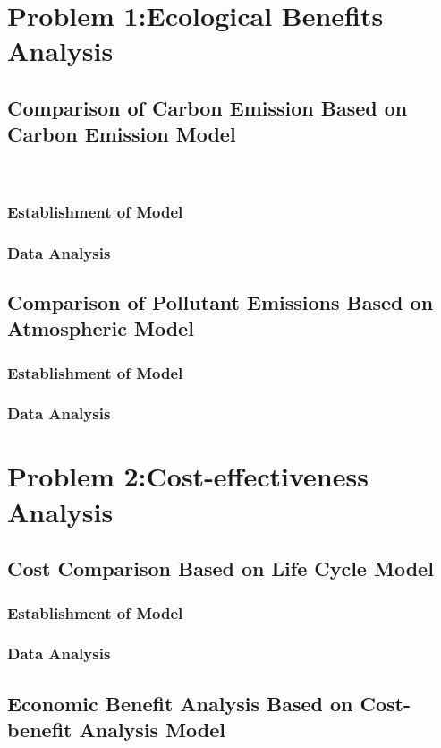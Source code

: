 \documentclass[12pt]{article}
\begin{document}
\section{Problem 1:Ecological Benefits Analysis}
\subsection{Comparison of Carbon Emission Based on Carbon Emission Model}\
\subsubsection{Establishment of Model}
\subsubsection{Data Analysis}

\subsection{Comparison of Pollutant Emissions Based on Atmospheric Model}
\subsubsection{Establishment of Model}
\subsubsection{Data Analysis}

\section{Problem 2:Cost-effectiveness Analysis}
\subsection{Cost Comparison Based on Life Cycle Model}
\subsubsection{Establishment of Model}
\subsubsection{Data Analysis}

\subsection{Economic Benefit Analysis Based on Cost-benefit Analysis Model}
\end{document}

